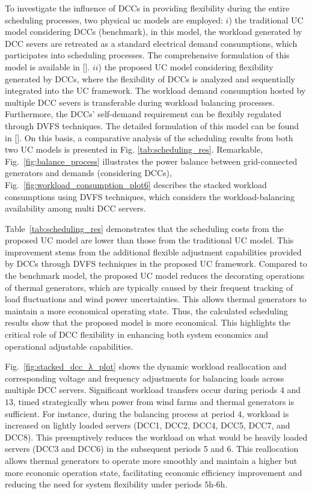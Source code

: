 \documentclass[lettersize,journal]{IEEEtran}
\begin{document}
To investigate the influence of DCCs in providing flexibility during the entire scheduling processes, two physical uc models are employed: 
$i$) the traditional UC model considering DCCs (benchmark), in this model, the workload generated by DCC severs are retreated as a standard electrical demand consumptions, which participates into scheduling processes. The comprehensive formulation of this model is available in [].
$ii$) the proposed UC model considering flexibility generated by DCCs, where the flexibility of DCCs is analyzed and sequentially integrated into the UC framework. The workload demand consumption hosted by multiple DCC severs is transferable during workload balancing processes. Furthermore, the DCCs' self-demand requirement can be flexibly regulated through DVFS techniques. The detailed formulation of this model can be found in []. On this basis, a comparative analysis of the scheduling results from both two UC models is presented in Fig. \ref{tab:scheduling_res}. Remarkable, Fig.~\ref{fig:balance_process} illustrates the power balance between grid-connected generators and demands (considering DCCs), Fig.~\ref{fig:workload_consumption_plot6} describes the stacked workload consumptions using DVFS techniques, which considers the workload-balancing availability among multi DCC servers.

Table~\ref{tab:scheduling_res} demonstrates that the scheduling costs from the proposed UC model are lower than those from the traditional UC model. This improvement stems from the additional flexible adjustment capabilities provided by DCCs through DVFS techniques in the proposed UC framework. Compared to the benchmark model, the proposed UC model reduces the decorating operations of thermal generators, which are typically caused by their frequent tracking of load fluctuations and wind power uncertainties. This allows thermal generators to maintain a more economical operating state. Thus, the calculated scheduling results show that the proposed model is more economical. This highlights the critical role of DCC flexibility in enhancing both system economics and operational adjustable capabilities.

Fig.~\ref{fig:stacked_dcc_λ_plot} shows the dynamic workload reallocation and corresponding voltage and frequency adjustments for balancing loads across multiple DCC servers. Significant workload transfers occur during periods $4$ and $13$, timed strategically when power from wind farms and thermal generators is sufficient. For instance, during the balancing process at period $4$, workload is increased on lightly loaded servers (DCC1, DCC2, DCC4, DCC5, DCC7, and DCC8). This preemptively reduces the workload on what would be heavily loaded servers (DCC3 and DCC6) in the subsequent periods 5 and $6$. This reallocation allows thermal generators to operate more smoothly and maintain a higher but more economic operation state, facilitating economic efficiency improvement and reducing the need for system flexibility under periods $5$h-$6$h.
\end{document}
